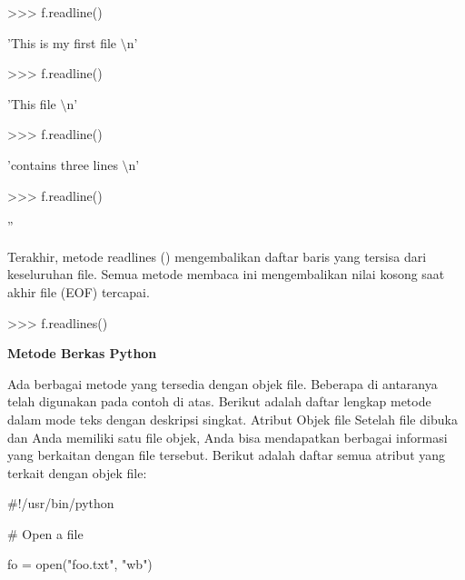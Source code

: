 \noindent 
>>> f.readline() \par
\noindent 
'This is my first file $  \setminus  $n' \par
\vspace{12pt}
\noindent 
>>> f.readline() \par
\noindent 
'This file $  \setminus  $n' \par
\vspace{12pt}
\noindent 
>>> f.readline() \par
\noindent 
'contains three lines $  \setminus  $n' \par
\vspace{12pt}
\noindent 
>>> f.readline() \par
\noindent 
'' \par
\vspace{12pt}
Terakhir, metode readlines () mengembalikan daftar baris yang tersisa dari keseluruhan file. Semua metode membaca ini mengembalikan nilai kosong saat akhir file (EOF) tercapai. \par
\vspace{12pt}
\noindent 
>>> f.readlines() \par
{} \par
\vspace{12pt}
\vspace{12pt}
\noindent 
{\fontsize{14pt}{14pt}\selectfont \textbf{Metode Berkas Python} \\} \par
\vspace{12pt}
Ada berbagai metode yang tersedia dengan objek file. Beberapa di antaranya telah digunakan pada contoh di atas. Berikut adalah daftar lengkap metode dalam mode teks dengan deskripsi singkat. Atribut Objek file Setelah file dibuka dan Anda memiliki satu file objek, Anda bisa mendapatkan berbagai informasi yang berkaitan dengan file tersebut. Berikut adalah daftar semua atribut yang terkait dengan objek file: \par
\vspace{12pt}
\vspace{12pt}
\vspace{12pt}
\noindent 
 $  \#  $!/usr/bin/python \par
\vspace{12pt}
\noindent 
 $  \#  $ Open a file \par
\noindent 
fo = open("foo.txt", "wb") \par
